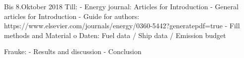 Bis 8.Oktober 2018
Till:
-	Energy journal: Articles for Introduction
-	General articles for Introduction
-	Guide for authors: https://www.elsevier.com/journals/energy/0360-5442?generatepdf=true
-	Fill methods and Material
o	Daten: Fuel data / Ship data / Emission budget

Frauke:
-	Results and discussion
-	Conclusion
